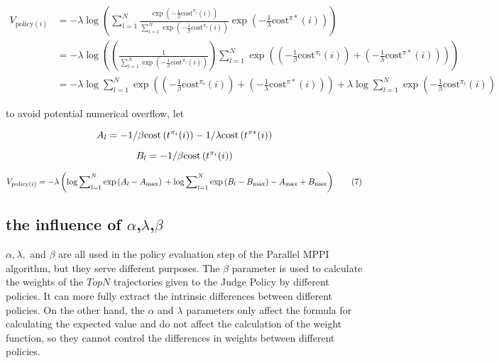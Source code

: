 \documentclass{article}
\begin{document}
	
\begin{align}
	{V_{\text{policy}(i)}} &= -\lambda \log \left( \sum_{l=1}^N \frac{\exp\left(-\frac{1}{\beta}\text{cost}^{\pi_i}(i)\right)}{\sum_{l=1}^N \exp\left(-\frac{1}{\beta}\text{cost}^{\pi_i}(i)\right)} \exp\left(-\frac{1}{\lambda}\text{cost}^{\pi *}(i)\right) \right) \nonumber \\
	&= -\lambda \log \left( \left(\frac{1}{\sum_{l=1}^N \exp\left(-\frac{1}{\beta}\text{cost}^{\pi_i}(i)\right)}\right)\sum_{l=1}^N \exp\left(\left(-\frac{1}{\beta}\text{cost}^{\pi_i}(i)\right) + \left(-\frac{1}{\lambda}\text{cost}^{\pi *}(i)\right)\right) \right) \nonumber \\
	&= -\lambda \log \sum_{l=1}^N \exp\left(\left(-\frac{1}{\beta}\text{cost}^{\pi_i}(i)\right) + \left(-\frac{1}{\lambda}\text{cost}^{\pi *}(i)\right)\right) + \lambda \log \sum_{l=1}^N \exp\left(-\frac{1}{\beta}\text{cost}^{\pi_i}(i)\right) \tag{6}
\end{align}

to avoid potential numerical overflow, let 

\[{A_l} =  - {1 \mathord{\left/
		{\vphantom {1 \beta }} \right.
		\kern-\nulldelimiterspace} \beta }\text{cost}\left( {t^{{\pi _i}}}(i) \right) - {1 \mathord{\left/
		{\vphantom {1 \lambda }} \right.
		\kern-\nulldelimiterspace} \lambda }\text{cost}\left( {t^{\pi *}}(i) \right)\]

\[{B_l} =  - {1 \mathord{\left/
		{\vphantom {1 \beta }} \right.
		\kern-\nulldelimiterspace} \beta }\text{cost}\left( {t^{{\pi _i}}}(i) \right)\]

\[{V_{\text{policy}(i)}} =  - \lambda \left( {\log \sum\nolimits_{l = 1}^N {\exp } \left( {{A_l} - {A_{\max }}} \right){\rm{ }} + \log \sum\nolimits_{l = 1}^N {\exp } \left( {{B_l} - {B_{\max }}} \right) - {A_{\max }} + {B_{\max }}} \right) \tag{7}\]


\subsection{the influence of $\alpha$,$\lambda$,$\beta$}
$\alpha, \lambda,$ and $\beta$ are all used in the policy evaluation step of the Parallel MPPI 
algorithm, but they serve different purposes. The $\beta$ parameter is used to calculate the weights of the $TopN$ trajectories given to the Judge Policy by different policies. It can more fully extract the intrinsic differences between different policies. On the other hand, the $\alpha$ and $\lambda$ parameters only affect the formula for calculating the expected value and do not affect the calculation of the weight function, so they cannot control the differences in weights between different policies.
\end{document}
